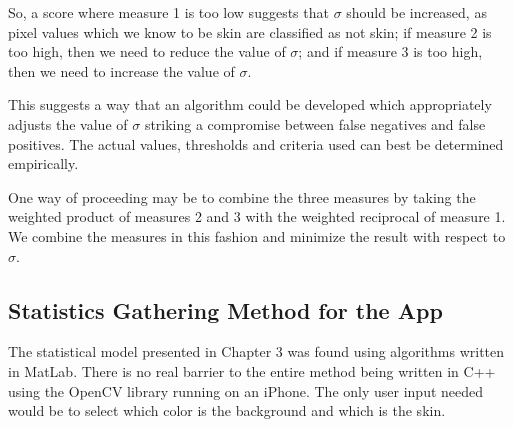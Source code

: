 So, a score where measure 1 is too low suggests that $\sigma$ should be increased, as pixel values which we know to be skin are classified as not skin; if measure 2 is too high, then we need to reduce the value of $\sigma$; and if measure 3 is too high, then we need to increase the value of $\sigma$.

This suggests a way that an algorithm could be developed which appropriately adjusts the value of $\sigma$ striking a compromise between false negatives and false positives. The actual values, thresholds and criteria used can best be determined empirically.

One way of proceeding may be to combine the three measures by taking the weighted product of measures 2 and 3 with the weighted reciprocal of measure 1. We combine the measures in this fashion and minimize the result with respect to $\sigma$.

\subsection{Statistics Gathering Method for the App}\label{sec:StatisticsGatheringMethod}
The statistical model presented in Chapter 3 was found using algorithms written in MatLab. There is no real barrier to the entire method being written in C++ using the OpenCV library running on an iPhone. The only user input needed would be to select which color is the background and which is the skin.

